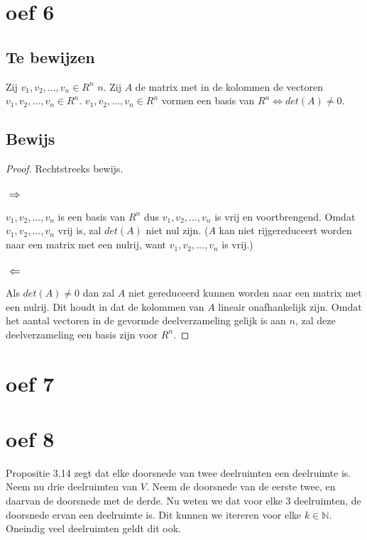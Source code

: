 \documentclass[lineaire_algebra_oplossingen.tex]{subfiles}
\begin{document}
\section{oef 6}
\subsection*{Te bewijzen}
Zij $v_1,v_2,...,v_n \in R^n$ $n$. Zij $A$ de matrix met in de kolommen de vectoren $v_1,v_2,...,v_n \in R^n$.
$v_1,v_2,...,v_n \in R^n$ vormen een basis van $R^n \Leftrightarrow det(A) \neq 0$.
\subsection*{Bewijs}
\begin{proof}
Rechtstreeks bewijs.
\subsubsection*{$\Rightarrow$}
$v_1,v_2,...,v_n$ is een basis van $R^n$ dus $v_1,v_2,...,v_n$ is vrij en voortbrengend. Omdat $v_1,v_2,...,v_n$ vrij is, zal $det(A)$ niet nul zijn. ($A$ kan niet rijgereduceert worden naar een matrix met een nulrij, want $v_1,v_2,...,v_n$ is vrij.)
\subsubsection*{$\Leftarrow$}
Als $det(A) \neq 0$ dan zal $A$ niet gereduceerd kunnen worden naar een matrix met een nulrij. Dit houdt in dat de kolommen van $A$ lineair onafhankelijk zijn. Omdat het aantal vectoren in de gevormde deelverzameling gelijk is aan $n$, zal deze deelverzameling een basis zijn voor $R^n$.
\end{proof}

\section{oef 7}


\section{oef 8}
Propositie 3.14 zegt dat elke doorsnede van twee deelruimten een deelruimte is. Neem nu drie deelruimten van $V$. Neem de doorsnede van de eerste twee, en daarvan de doorsnede met de derde. Nu weten we dat voor elke $3$ deelruimten, de doorsnede ervan een deelruimte is. Dit kunnen we itereren voor elke $k \in \mathbb{N}$. Oneindig veel deelruimten geldt dit ook.
\end{document}
